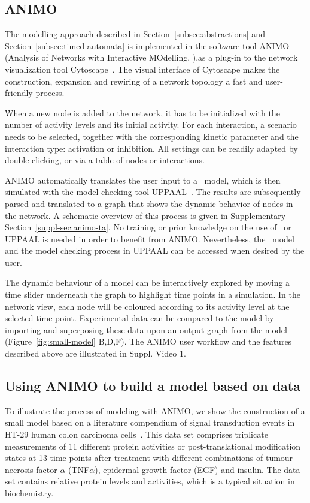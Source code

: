 \subsection{ANIMO}
The modelling approach described in Section~\ref{subsec:abstractions} and Section~\ref{subsec:timed-automata}
is implemented in the
software tool ANIMO (Analysis of Networks with Interactive MOdelling, \citealt{animo-bibe}),as
a plug-in to the network visualization tool Cytoscape~\citep{cytoscape}. The visual interface of Cytoscape
makes the construction, expansion and rewiring of a network topology a fast and user-friendly process. 

When a new node is added to the network, it has to be initialized with the number of activity levels and 
its initial activity. 
For each interaction, a scenario needs to be selected, together with the corresponding kinetic parameter and 
the interaction type: activation or inhibition. All settings can be readily adapted by double clicking, or via a 
table of nodes or interactions. 

ANIMO automatically translates the user input to a \tas\ model, which is then simulated with the model 
checking tool UPPAAL~\citep{uppaal}. The results are subsequently parsed and translated to a graph that shows
the dynamic behavior of nodes in the network. 
A schematic overview of this process is given in Supplementary Section~\ref{suppl-sec:animo-ta}.
No training or prior knowledge on the use of \tas\ or UPPAAL is needed in order to benefit from ANIMO.
Nevertheless, the \tas\ model and the model checking process in UPPAAL can be accessed when desired by the user.

The dynamic behaviour of a model can be interactively explored by
moving a time slider underneath the graph to highlight time points in a simulation. In the network view,
each node will be coloured according to its activity level at the selected time point. 
Experimental data can be compared to the model by importing and superposing these data 
upon an output graph from the model (Figure~\ref{fig:small-model} B,D,F). The ANIMO user workflow and the 
features described above are illustrated in Suppl. Video 1.






\subsection{Using ANIMO to build a model based on data}\label{subsec:case-study}
To illustrate the process of modeling with ANIMO, we show the construction of a small model based on a 
literature compendium of signal transduction events in HT-29 human colon carcinoma cells~\citep{pathway-compendium}. 
This data set comprises triplicate
measurements of 11 different protein activities or post-translational modification states at 13 time points after
treatment with different combinations of tumour necrosis factor-$\alpha$ (TNF$\alpha$), epidermal growth factor 
(EGF) and insulin.
The data set contains relative protein levels and activities, which is a typical situation in biochemistry.

